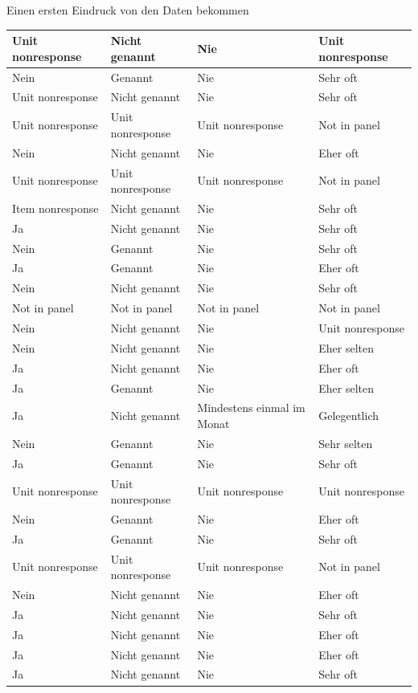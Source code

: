 \documentclass[ignorenonframetext,]{beamer}
\begin{document}
\begin{frame}{Einen ersten Eindruck von den Daten bekommen}
\begin{tabular}{l|l|l|l}
\hline
Unit nonresponse & Nicht genannt & Nie & Unit nonresponse\\
\hline
Nein & Genannt & Nie & Sehr oft\\
\hline
Unit nonresponse & Nicht genannt & Nie & Sehr oft\\
\hline
Unit nonresponse & Unit nonresponse & Unit nonresponse & Not in panel\\
\hline
Nein & Nicht genannt & Nie & Eher oft\\
\hline
Unit nonresponse & Unit nonresponse & Unit nonresponse & Not in panel\\
\hline
Item nonresponse & Nicht genannt & Nie & Sehr oft\\
\hline
Ja & Nicht genannt & Nie & Sehr oft\\
\hline
Nein & Genannt & Nie & Sehr oft\\
\hline
Ja & Genannt & Nie & Eher oft\\
\hline
Nein & Nicht genannt & Nie & Sehr oft\\
\hline
Not in panel & Not in panel & Not in panel & Not in panel\\
\hline
Nein & Nicht genannt & Nie & Unit nonresponse\\
\hline
Nein & Nicht genannt & Nie & Eher selten\\
\hline
Ja & Nicht genannt & Nie & Eher oft\\
\hline
Ja & Genannt & Nie & Eher selten\\
\hline
Ja & Nicht genannt & Mindestens einmal im Monat & Gelegentlich\\
\hline
Nein & Genannt & Nie & Sehr selten\\
\hline
Ja & Genannt & Nie & Sehr oft\\
\hline
Unit nonresponse & Unit nonresponse & Unit nonresponse & Unit nonresponse\\
\hline
Nein & Genannt & Nie & Eher oft\\
\hline
Ja & Genannt & Nie & Sehr oft\\
\hline
Unit nonresponse & Unit nonresponse & Unit nonresponse & Not in panel\\
\hline
Nein & Nicht genannt & Nie & Eher oft\\
\hline
Ja & Nicht genannt & Nie & Sehr oft\\
\hline
Ja & Nicht genannt & Nie & Eher oft\\
\hline
Ja & Nicht genannt & Nie & Eher oft\\
\hline
Ja & Nicht genannt & Nie & Sehr oft\\

\end{tabular}
\end{frame}
\end{document}
